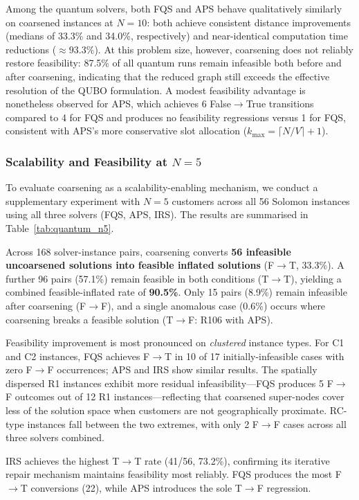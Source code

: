 \documentclass[conference]{IEEEtran}
\begin{document}
Among the quantum solvers, both FQS and APS behave qualitatively similarly on coarsened instances at $N=10$: both achieve consistent distance improvements (medians of 33.3\% and 34.0\%, respectively) and near-identical computation time reductions ($\approx 93.3\%$). At this problem size, however, coarsening does not reliably restore feasibility: 87.5\% of all quantum runs remain infeasible both before and after coarsening, indicating that the reduced graph still exceeds the effective resolution of the QUBO formulation. A modest feasibility advantage is nonetheless observed for APS, which achieves 6 False$\to$True transitions compared to 4 for FQS and produces no feasibility regressions versus 1 for FQS, consistent with APS's more conservative slot allocation ($k_\text{max} = \lceil N/V \rceil + 1$).

\subsubsection*{Scalability and Feasibility at $N=5$}

To evaluate coarsening as a scalability-enabling mechanism, we conduct a supplementary experiment with $N=5$ customers across all 56 Solomon instances using all three solvers (FQS, APS, IRS). The results are summarised in Table~\ref{tab:quantum_n5}.

Across 168 solver-instance pairs, coarsening converts \textbf{56 infeasible uncoarsened solutions into feasible inflated solutions} (F$\to$T, 33.3\%). A further 96 pairs (57.1\%) remain feasible in both conditions (T$\to$T), yielding a combined feasible-inflated rate of \textbf{90.5\%}. Only 15 pairs (8.9\%) remain infeasible after coarsening (F$\to$F), and a single anomalous case (0.6\%) occurs where coarsening breaks a feasible solution (T$\to$F: R106 with APS).

Feasibility improvement is most pronounced on \emph{clustered} instance types. For C1 and C2 instances, FQS achieves F$\to$T in 10 of 17 initially-infeasible cases with zero F$\to$F occurrences; APS and IRS show similar results. The spatially dispersed R1 instances exhibit more residual infeasibility---FQS produces 5 F$\to$F outcomes out of 12 R1 instances---reflecting that coarsened super-nodes cover less of the solution space when customers are not geographically proximate. RC-type instances fall between the two extremes, with only 2 F$\to$F cases across all three solvers combined.

IRS achieves the highest T$\to$T rate (41/56, 73.2\%), confirming its iterative repair mechanism maintains feasibility most reliably. FQS produces the most F$\to$T conversions (22), while APS introduces the sole T$\to$F regression.
\end{document}
